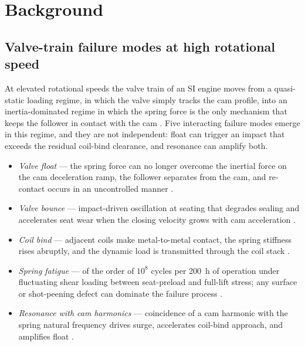 
\section{Background}\label{sec:background}

\subsection{Valve-train failure modes at high rotational speed}
\label{sec:bg-failure-modes}

At elevated rotational speeds the valve train of an SI engine moves
from a quasi-static loading regime, in which the valve simply tracks
the cam profile, into an inertia-dominated regime in which the spring
force is the only mechanism that keeps the follower in contact with
the cam \citep{heywood1988,taylor1985}. Five interacting failure
modes emerge in this regime, and they are not independent: float can
trigger an impact that exceeds the residual coil-bind clearance,
and resonance can amplify both.

\begin{itemize}\setlength{\itemsep}{0.2em}
\item \emph{Valve float} --- the spring force can no longer overcome
the inertial force on the cam deceleration ramp, the follower
separates from the cam, and re-contact occurs in an uncontrolled
manner \citep{heywood1988,taylor1985}.
\item \emph{Valve bounce} --- impact-driven oscillation at seating
that degrades sealing and accelerates seat wear when the closing
velocity grows with cam acceleration \citep{heywood1988}.
\item \emph{Coil bind} --- adjacent coils make metal-to-metal contact,
the spring stiffness rises abruptly, and the dynamic load is
transmitted through the coil stack \citep{shigley2020}.
\item \emph{Spring fatigue} --- of the order of $10^{8}$ cycles per
200~h of operation under fluctuating shear loading between
seat-preload and full-lift stress; any surface or shot-peening
defect can dominate the failure process \citep{shigley2020}.
\item \emph{Resonance with cam harmonics} --- coincidence of a cam
harmonic with the spring natural frequency drives surge, accelerates
coil-bind approach, and amplifies float \citep{heywood1988}.
\end{itemize}

